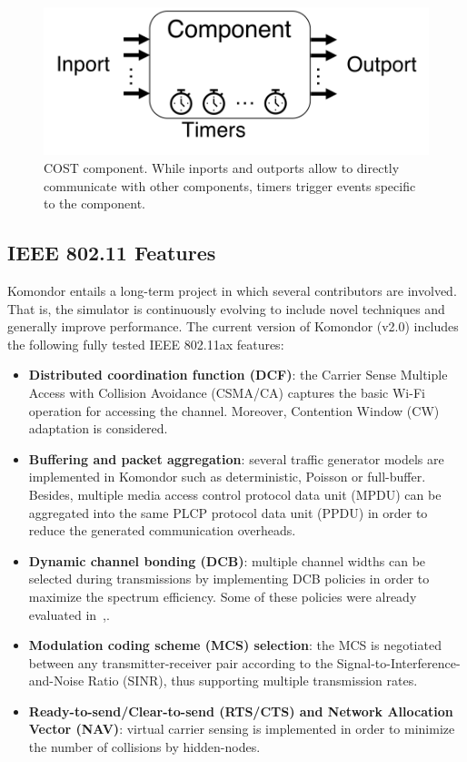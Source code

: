 \documentclass{article}
\begin{document}
	\begin{figure}[h!]
		\centering
		\includegraphics[width=0.4\columnwidth]{cost_component.png}
		\caption{COST component. While inports and outports allow to directly communicate with other components, timers trigger events specific to the component.}
		\label{fig:cost}
	\end{figure}	
	
	\subsection{IEEE 802.11 Features}
	\label{subsection:features}
    Komondor entails a long-term project in which several contributors are involved. That is, the simulator is continuously evolving to include novel techniques and generally improve performance. The current version of Komondor (v2.0) includes the following fully tested IEEE 802.11ax features:
	\begin{itemize}
		\item \textbf{Distributed coordination function (DCF)}: the Carrier Sense Multiple Access with Collision Avoidance (CSMA/CA) captures the basic Wi-Fi operation for accessing the channel. Moreover, Contention Window (CW) adaptation is considered.
		\item \textbf{Buffering and packet aggregation}: several traffic generator models are implemented in Komondor such as deterministic, Poisson or full-buffer. Besides, multiple media access control protocol data unit (MPDU) can be aggregated into the same PLCP protocol data unit (PPDU) in order to reduce the generated communication overheads.
		\item \textbf{Dynamic channel bonding (DCB)}: multiple channel widths can be selected during transmissions by implementing DCB policies in order to maximize the spectrum efficiency. Some of these policies were already evaluated in~\cite{barrachina2019dynamic},\cite{barrachina2019overlap}.
		\item\textbf{Modulation coding scheme (MCS) selection}: the MCS is negotiated between any transmitter-receiver pair according to the Signal-to-Interference-and-Noise Ratio (SINR), thus supporting multiple transmission rates.
		\item \textbf{Ready-to-send/Clear-to-send (RTS/CTS) and Network Allocation Vector (NAV)}: virtual carrier sensing is implemented in order to minimize the number of collisions by hidden-nodes.
	\end{itemize}
	
\end{document}
